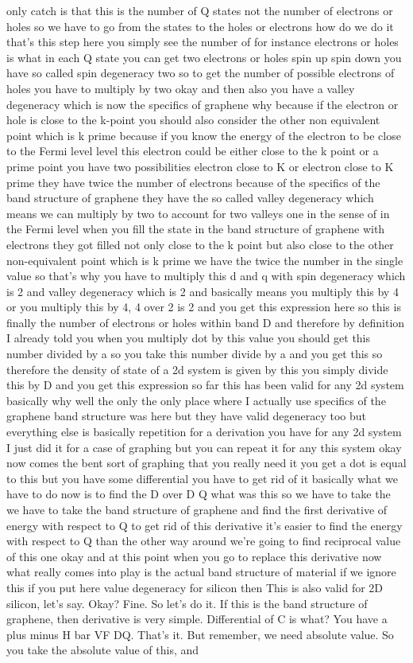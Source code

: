 only catch is that this is the number of Q states not the number of electrons or holes so we have to go from the states to the holes or electrons how do we do it that's this step here you simply see the number of for instance electrons or holes is what in each Q state you can get two electrons or holes spin up spin down you have so called spin degeneracy two so to get the number of possible electrons of holes you have to multiply by two okay and then also you have a valley degeneracy which is now the specifics of graphene why because if the electron or hole is close to the k-point you should also consider the other non equivalent point which is k prime because if you know the energy of the electron to be close to the Fermi level level this electron could be either close to the k point or a prime point you have two possibilities electron close to K or electron close to K prime they have twice the number of electrons because of the specifics of the band structure of graphene they have the so called valley degeneracy which means we can multiply by two to account for two valleys one in the sense of in the Fermi level when you fill the state in the band structure of graphene with electrons they got filled not only close to the k point but also close to the other non-equivalent point which is k prime we have the twice the number in the single value so that's why you have to multiply this d and q with spin degeneracy which is 2 and valley degeneracy which is 2 and basically means you multiply this by 4 or you multiply this by 4, 4 over 2 is 2 and you get this expression here so this is finally the number of electrons or holes within band D and therefore by definition I already told you when you multiply dot by this value you should get this number divided by a so you take this number divide by a and you get this so therefore the density of state of a 2d system is given by this you simply divide this by D and you get this expression so far this has been valid for any 2d system basically why well the only the only place where I actually use specifics of the graphene band structure was here but they have valid degeneracy too but everything else is basically repetition for a derivation you have for any 2d system I just did it for a case of graphing but you can repeat it for any this system okay now comes the bent sort of graphing that you really need it you get a dot is equal to this but you have some differential you have to get rid of it basically what we have to do now is to find the D over D Q what was this so we have to take the we have to take the band structure of graphene and find the first derivative of energy with respect to Q to get rid of this derivative it's easier to find the energy with respect to Q than the other way around we're going to find reciprocal value of this one okay and at this point when you go to replace this derivative now what really comes into play is the actual band structure of material if we ignore this if you put here value degeneracy for silicon then This is also valid for 2D silicon, let's say. Okay? Fine. So let's do it. If this is the band structure of graphene, then derivative is very simple. Differential of C is what? You have a plus minus H bar VF DQ. That's it. But remember, we need absolute value. So you take the absolute value of this, and 